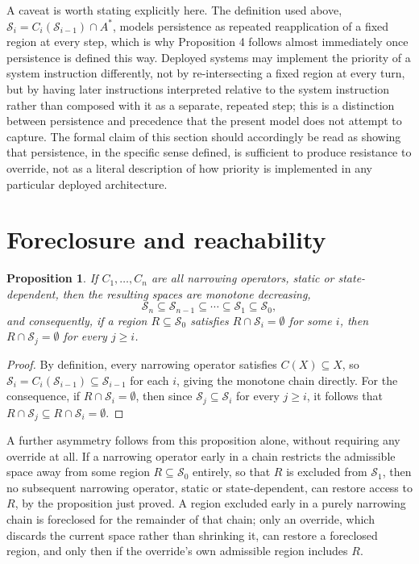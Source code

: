\documentclass[11pt]{article}
\newtheorem{proposition}{Proposition}
\begin{document}
A caveat is worth stating explicitly here. The definition used above, $\mathcal{S}_i = C_i(\mathcal{S}_{i-1}) \cap A^{\ast}$, models persistence as repeated reapplication of a fixed region at every step, which is why Proposition 4 follows almost immediately once persistence is defined this way. Deployed systems may implement the priority of a system instruction differently, not by re-intersecting a fixed region at every turn, but by having later instructions interpreted relative to the system instruction rather than composed with it as a separate, repeated step; this is a distinction between persistence and precedence that the present model does not attempt to capture. The formal claim of this section should accordingly be read as showing that persistence, in the specific sense defined, is sufficient to produce resistance to override, not as a literal description of how priority is implemented in any particular deployed architecture.

\section{Foreclosure and reachability}

\begin{proposition}
If $C_1, \ldots, C_n$ are all narrowing operators, static or state-dependent, then the resulting spaces are monotone decreasing,
\[
\mathcal{S}_n \subseteq \mathcal{S}_{n-1} \subseteq \cdots \subseteq \mathcal{S}_1 \subseteq \mathcal{S}_0,
\]
and consequently, if a region $R \subseteq \mathcal{S}_0$ satisfies $R \cap \mathcal{S}_i = \emptyset$ for some $i$, then $R \cap \mathcal{S}_j = \emptyset$ for every $j \geq i$.
\end{proposition}

\begin{proof}
By definition, every narrowing operator satisfies $C(X) \subseteq X$, so $\mathcal{S}_i = C_i(\mathcal{S}_{i-1}) \subseteq \mathcal{S}_{i-1}$ for each $i$, giving the monotone chain directly. For the consequence, if $R \cap \mathcal{S}_i = \emptyset$, then since $\mathcal{S}_j \subseteq \mathcal{S}_i$ for every $j \geq i$, it follows that $R \cap \mathcal{S}_j \subseteq R \cap \mathcal{S}_i = \emptyset$.
\end{proof}

A further asymmetry follows from this proposition alone, without requiring any override at all. If a narrowing operator early in a chain restricts the admissible space away from some region $R \subseteq \mathcal{S}_0$ entirely, so that $R$ is excluded from $\mathcal{S}_1$, then no subsequent narrowing operator, static or state-dependent, can restore access to $R$, by the proposition just proved. A region excluded early in a purely narrowing chain is foreclosed for the remainder of that chain; only an override, which discards the current space rather than shrinking it, can restore a foreclosed region, and only then if the override's own admissible region includes $R$.
\end{document}
